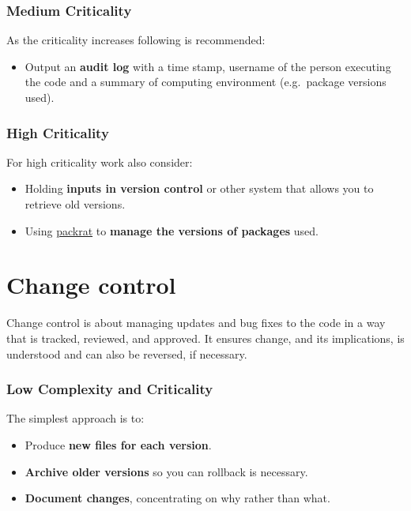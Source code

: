 \documentclass[]{book}
\providecommand{\tightlist}{%
  \setlength{\itemsep}{0pt}\setlength{\parskip}{0pt}}
\begin{document}
\hypertarget{medium-criticality-2}{%
\subsubsection{Medium Criticality}\label{medium-criticality-2}}

As the criticality increases following is recommended:

\begin{itemize}
\tightlist
\item
  Output an \textbf{audit log} with a time stamp, username of the person executing the code and a
  summary of computing environment (e.g.~package versions used).
\end{itemize}

\hypertarget{high-criticality-2}{%
\subsubsection{High Criticality}\label{high-criticality-2}}

For high criticality work also consider:

\begin{itemize}
\tightlist
\item
  Holding \textbf{inputs in version control} or other system that allows you to retrieve old versions.
\item
  Using \href{https://rstudio.github.io/packrat/}{packrat} to \textbf{manage the versions of packages} used.
\end{itemize}

\hypertarget{change-control}{%
\section{Change control}\label{change-control}}

Change control is about managing updates and bug fixes to the code in a way that is
tracked, reviewed, and approved. It ensures change, and its implications, is understood
and can also be reversed, if necessary.

\hypertarget{low-complexity-and-criticality-3}{%
\subsubsection{Low Complexity and Criticality}\label{low-complexity-and-criticality-3}}

The simplest approach is to:

\begin{itemize}
\tightlist
\item
  Produce \textbf{new files for each version}.
\item
  \textbf{Archive older versions} so you can rollback is necessary.
\item
  \textbf{Document changes}, concentrating on why rather than what.
\end{itemize}
\end{document}

